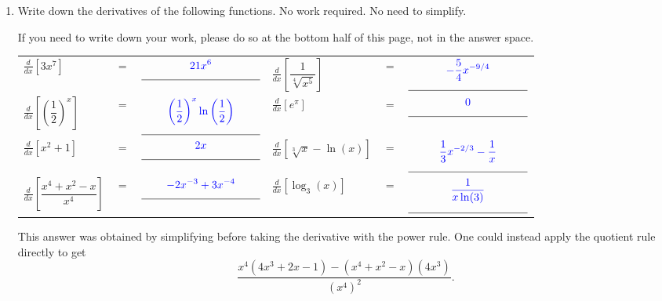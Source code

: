 \documentclass[11pt]{article}
\begin{document}
\begin{enumerate}
\newpage


\item Write down the derivatives of the following functions. No work required. No need to simplify.

If you need to write down your work, please do so at the bottom half of this page, not in the answer space.

\begin{center}
        \begin{tabular}{l c c l c c}
            $\displaystyle\frac{d}{dx}\left[ 3x^{7} \right]$ & $=$ & $\overset{\displaystyle{\color{blue} 21x^6}}{\rule[-8pt]{1.5in}{0.4pt}}$ &
            $\displaystyle\frac{d}{dx}\left[ \dfrac{1}{\sqrt[4]{x^5}} \right]$ & $=$ & $\overset{\displaystyle{\color{blue} -\frac{5}{4}x^{-9/4}}}{\rule[-8pt]{1.5in}{0.4pt}}$\\[4cm]

            $\displaystyle\frac{d}{dx}\left[ \left(\dfrac{1}{2}\right)^x \right]$ & $=$ & $\overset{\displaystyle{\color{blue} \left(\frac{1}{2}\right)^x\ln\left(\frac{1}{2}\right)}}{\rule[-8pt]{1.5in}{0.4pt}}$ & 
            $\displaystyle\frac{d}{dx}\left[ e^{\pi} \right]$ & $=$ & $\overset{\displaystyle{\color{blue} 0}}{\rule[-8pt]{1.5in}{0.4pt}}$\\[4cm]
            $\displaystyle\frac{d}{dx}\left[ x^2+1 \right]$ & $=$ & $\overset{\displaystyle{\color{blue} 2x}}{\rule[-8pt]{1.5in}{0.4pt}}$&
            $\displaystyle\frac{d}{dx}\left[ \sqrt[3]{x}-\ln(x) \right]$ & $=$ & $\overset{\displaystyle{\color{blue} \frac{1}{3}x^{-2/3} - \frac{1}{x}}}{\rule[-8pt]{1.5in}{0.4pt}}$\\[4cm]
            $\displaystyle\frac{d}{dx}\left[ \dfrac{x^4+x^2-x}{x^4} \right]$ & $=$ & $\overset{\displaystyle{\color{blue} -2x^{-3} + 3x^{-4}}}{\rule[-8pt]{1.5in}{0.4pt}}$ & 
            $\displaystyle\frac{d}{dx}\left[ \log_{3}(x) \right]$ & $=$ & $\overset{\displaystyle{\color{blue} \frac{1}{x\ln(3)}}}{\rule[-8pt]{1.5in}{0.4pt}}$
        \end{tabular}
\end{center}
\hspace{1cm}\begin{minipage}{0.4\textwidth}
    {\color{blue} This answer was obtained by simplifying before taking the derivative with the power rule. One could instead apply the quotient rule directly to get
    \[
        \frac{x^4(4x^3+2x-1) - (x^4+x^2-x)(4x^3)}{(x^4)^2}.
    \]
    }
\end{minipage}



\end{enumerate}
\end{document}
